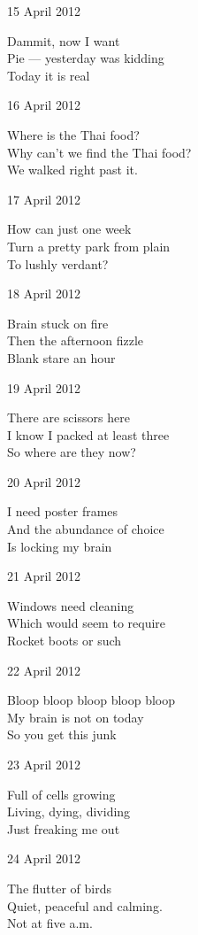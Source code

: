 \documentclass[12pt]{article}
\begin{document}
15 April 2012

Dammit, now I want \\
Pie --- yesterday was kidding \\
Today it is real

16 April 2012

Where is the Thai food? \\
Why can't we find the Thai food? \\
We walked right past it.

\newpage

17 April 2012

How can just one week \\
Turn a pretty park from plain \\
To lushly verdant?

18 April 2012

Brain stuck on fire \\
Then the afternoon fizzle \\
Blank stare an hour

19 April 2012

There are scissors here \\
I know I packed at least three \\
So where are they now?

20 April 2012

I need poster frames \\
And the abundance of choice \\
Is locking my brain

21 April 2012

Windows need cleaning \\
Which would seem to require \\
Rocket boots or such

22 April 2012

Bloop bloop bloop bloop bloop \\
My brain is not on today \\
So you get this junk

23 April 2012

Full of cells growing \\
Living, dying, dividing \\
Just freaking me out

\newpage

24 April 2012

The flutter of birds \\
Quiet, peaceful and calming. \\
Not at five a.m.
\end{document}
